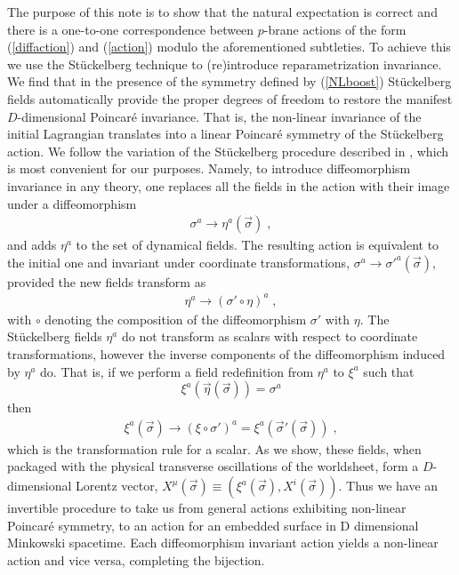 \documentclass[%
 reprint,
 amsmath,amssymb,
 aps,
]{revtex4-1}
\begin{document}
The purpose of this note is to show that the natural expectation is correct and there is a one-to-one correspondence between $p$-brane actions
of the form (\ref{diffaction}) and (\ref{action}) modulo the aforementioned subtleties. To achieve this we use the St\"uckelberg technique
to (re)introduce reparametrization invariance. We find that in the presence of the symmetry defined by
(\ref{NLboost}) St\"uckelberg fields automatically provide the proper degrees of freedom to restore the
manifest $D$-dimensional Poincar\'e invariance. That is, the non-linear invariance of the initial
Lagrangian translates into a linear Poincar\'e symmetry of the St\"uckelberg action.
We follow the variation of the St\"uckelberg procedure described in
\cite{Dubovsky:2004sg}, which is most convenient for our purposes.
Namely, to introduce  diffeomorphism invariance in any theory, one
replaces all the fields in the action with their image under a diffeomorphism
\begin{eqnarray}
    \sigma^{a} \rightarrow \eta^{a}(\vec{\sigma}) \; , \nonumber
\end{eqnarray}
and adds $\eta^a$ to the set of dynamical fields. The resulting action is equivalent to the initial one and invariant under
coordinate transformations, $\sigma^a \rightarrow \sigma'^a(\vec{\sigma})$, provided the new fields transform as
\begin{eqnarray}
    \eta^{a} \rightarrow \left( \sigma' \circ \eta \right)^{a} \; , \nonumber
\end{eqnarray}
with $\circ$ denoting the composition of the diffeomorphism $\sigma'$ with $\eta$.
The St\"uckelberg fields $\eta^a$  do not transform as scalars with respect to coordinate transformations,
however  the inverse components of the diffeomorphism induced by $\eta^a$ do.  That is,
if we perform a field redefinition from $\eta^a$ to $\xi^{a}$ such that
\begin{equation}
\label{etadef}
\xi^{a}(\vec{\eta}(\vec{\sigma})) = \sigma^{a}
\end{equation}
 then
\begin{eqnarray}
    \xi^{a}(\vec{\sigma}) \rightarrow \left( \xi \circ \sigma' \right)^{a} = \xi^a(\vec{\sigma}'(\vec{\sigma})) \nonumber \; ,
\end{eqnarray}
which is the transformation rule for a scalar.
As we show, these fields, when packaged with the physical transverse oscillations
of the worldsheet, form a $D$-dimensional Lorentz vector,
$X^{\mu}(\vec{\sigma}) \equiv (\xi^a(\vec{\sigma}),X^i(\vec{\sigma}))$.
Thus we have an invertible procedure to take us from general actions exhibiting non-linear Poincar\'e symmetry, to an
action for an embedded surface in D dimensional Minkowski spacetime.  Each diffeomorphism invariant action yields a non-linear
action and vice versa, completing the bijection.
\end{document}
